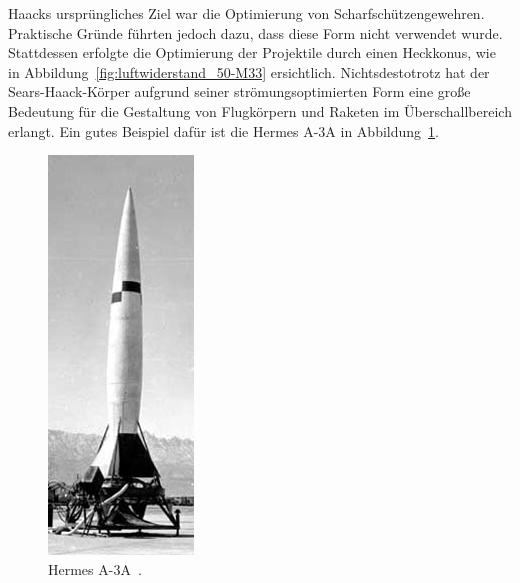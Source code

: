 Haacks ursprüngliches Ziel war die Optimierung von Scharfschützengewehren. 
Praktische Gründe führten jedoch dazu, dass diese 
Form nicht verwendet wurde. 
Stattdessen erfolgte die Optimierung der Projektile 
durch einen Heckkonus, wie in Abbildung~\ref{fig:luftwiderstand_50-M33} ersichtlich.
Nichtsdestotrotz hat der Sears-Haack-Körper aufgrund 
seiner strömungsoptimierten Form eine große Bedeutung 
für die Gestaltung von Flugkörpern und Raketen
im Überschallbereich erlangt.
Ein gutes Beispiel dafür ist die Hermes A-3A 
in Abbildung~\ref{fig:hermes}.
\begin{figure}
    \centering
    \includegraphics[height=\textwidth, angle=90]{papers/ueberschall/figures/hermes-a3a.jpg}
    \caption{Hermes A-3A~\cite{WeebauHermesA3A}.}
    \label{fig:hermes}
\end{figure}


